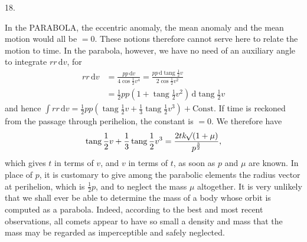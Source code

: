 \par{}
\begin{center}
\hypertarget{native-036-article018}{}18.
\end{center}
In the PARABOLA, the eccentric anomaly, the mean anomaly and the mean motion would all be $=0$. These notions therefore cannot serve here to relate the motion to time. In the parabola, however, we have no need of an auxiliary angle to integrate $r r\,\mathrm{d}v$, for
\[
\begin{aligned}
r r\,\mathrm{d}v&=\frac{p p\,\mathrm{d}v}{4\cos\frac{1}{2}v^4}=\frac{p p\,\mathrm{d}\operatorname{tang}\frac{1}{2}v}{2\cos\frac{1}{2}v^2}\\
&=\frac{1}{2}p p(1+\operatorname{tang}\frac{1}{2}v^2)\,\mathrm{d}\operatorname{tang}\frac{1}{2}v
\end{aligned}
\]
and hence $\int r r\,\mathrm{d}v=\frac{1}{2}p p(\operatorname{tang}\frac{1}{2}v+\frac{1}{3}\operatorname{tang}\frac{1}{2}v^3)+\mathrm{Const.}$ If time is reckoned from the passage through perihelion, the constant is $=0$. We therefore have
\[
\operatorname{tang}\frac{1}{2}v+\frac{1}{3}\operatorname{tang}\frac{1}{2}v^3=\frac{2t k\mathord{{}^{}\!\surd}(1+\mu)}{p^{\frac{3}{2}}},
\]
which gives $t$ in terms of $v$, and $v$ in terms of $t$, as soon as $p$ and $\mu$ are known. In place of $p$, it is customary to give among the parabolic elements the radius vector at perihelion, which is $\frac{1}{2}p$, and to neglect the mass $\mu$ altogether. It is very unlikely that we shall ever be able to determine the mass of a body whose orbit is computed as a parabola. Indeed, according to the best and most recent observations, all comets appear to have so small a density and mass that the mass may be regarded as imperceptible and safely neglected.
